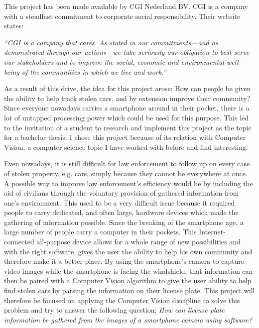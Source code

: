 
This project has been made available by CGI Nederland BV. CGI is a company with a steadfast commitment to corporate social responsibility. Their website states:

\textit{``CGI is a company that cares. As stated in our commitments—and as demonstrated through our actions—we take seriously our obligation to best serve our stakeholders and to improve the social, economic and environmental well-being of the communities in which we live and work.''} \cite{csr-cgi}

As a result of this drive, the idea for this project arose: How can people be given the ability to help track stolen cars, and by extension improve their community? Since everyone nowadays carries a smartphone around in their pocket, there is a lot of untapped processing power which could be used for this purpose. This led to the invitation of a student to research and implement this project as the topic for a bachelor thesis. I chose this project because of its relation with Computer Vision, a computer science topic I have worked with before and find interesting.


Even nowadays, it is still difficult for law enforcement to follow up on every case of stolen property, e.g. cars, simply because they cannot be everywhere at once. A possible way to improve law enforcement's efficiency would be by including the aid of civilians through the voluntary provision of gathered information from one's environment. This used to be a very difficult issue because it required people to carry dedicated, and often large, hardware devices which made the gathering of information possible. Since the breaking of the smartphone age, a large number of people carry a computer in their pockets. This Internet-connected all-purpose device allows for a whole range of new possibilities and with the right software, gives the user the ability to help his own community and therefore make it a better place. By using the smartphone's camera to capture video images while the smartphone is facing the windshield, that information can then be paired with a Computer Vision algorithm to give the user ability to help find stolen cars by parsing the information on their license plate. This project will therefore be focused on applying the Computer Vision discipline to solve this problem and try to answer the following question: \textit{How can license plate information be gathered from the images of a smartphone camera using software?}

